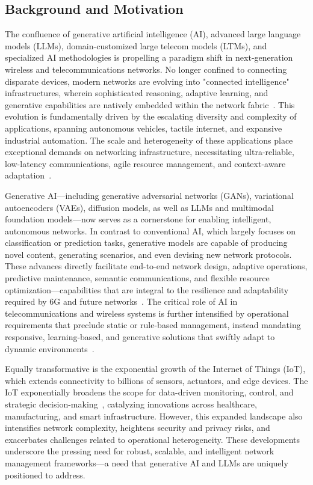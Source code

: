 \subsection{Background and Motivation}

The confluence of generative artificial intelligence (AI), advanced large language models (LLMs), domain-customized large telecom models (LTMs), and specialized AI methodologies is propelling a paradigm shift in next-generation wireless and telecommunications networks. No longer confined to connecting disparate devices, modern networks are evolving into "connected intelligence" infrastructures, wherein sophisticated reasoning, adaptive learning, and generative capabilities are natively embedded within the network fabric~\cite{ref46,ref49}. This evolution is fundamentally driven by the escalating diversity and complexity of applications, spanning autonomous vehicles, tactile internet, and expansive industrial automation. The scale and heterogeneity of these applications place exceptional demands on networking infrastructure, necessitating ultra-reliable, low-latency communications, agile resource management, and context-aware adaptation~\cite{ref46,ref49}.

Generative AI—including generative adversarial networks (GANs), variational autoencoders (VAEs), diffusion models, as well as LLMs and multimodal foundation models—now serves as a cornerstone for enabling intelligent, autonomous networks. In contrast to conventional AI, which largely focuses on classification or prediction tasks, generative models are capable of producing novel content, generating scenarios, and even devising new network protocols. These advances directly facilitate end-to-end network design, adaptive operations, predictive maintenance, semantic communications, and flexible resource optimization—capabilities that are integral to the resilience and adaptability required by 6G and future networks~\cite{ref1,ref7,ref21,ref26,ref33}. The critical role of AI in telecommunications and wireless systems is further intensified by operational requirements that preclude static or rule-based management, instead mandating responsive, learning-based, and generative solutions that swiftly adapt to dynamic environments~\cite{ref13,ref21,ref26}.

Equally transformative is the exponential growth of the Internet of Things (IoT), which extends connectivity to billions of sensors, actuators, and edge devices. The IoT exponentially broadens the scope for data-driven monitoring, control, and strategic decision-making~\cite{ref45}, catalyzing innovations across healthcare, manufacturing, and smart infrastructure. However, this expanded landscape also intensifies network complexity, heightens security and privacy risks, and exacerbates challenges related to operational heterogeneity. These developments underscore the pressing need for robust, scalable, and intelligent network management frameworks—a need that generative AI and LLMs are uniquely positioned to address.

